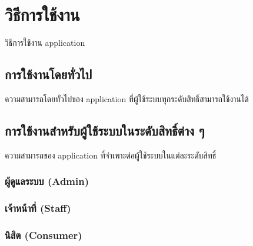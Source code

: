 \section{วิธีการใช้งาน \appName}

วิธีการใช้งาน application

\subsection{การใช้งานโดยทั่วไป}
ความสามารถโดยทั่วไปของ application ที่ผู้ใช้ระบบทุกระดับสิทธิ์สามารถใช้งานได้

\rule{0em}{1ex}

\noindent\blindtext[3]

\subsection{การใช้งานสำหรับผู้ใช้ระบบในระดับสิทธิ์ต่าง ๆ}
ความสามารถของ application ที่จำเพาะต่อผู้ใช้ระบบในแต่ละระดับสิทธิ์

\subsubsection{ผู้ดูแลระบบ (Admin)}
\noindent\blindtext[3]

\subsubsection{เจ้าหน้าที่ (Staff)}
\noindent\blindtext[3]

\subsubsection{นิสิต (Consumer)}
\noindent\blindtext[3]
